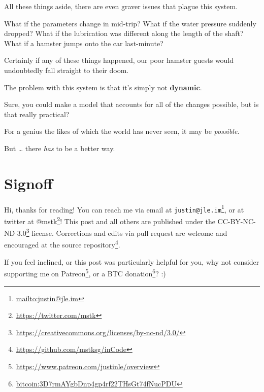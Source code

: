 \documentclass[]{article}
\renewcommand{\href}[2]{#2\footnote{\url{#1}}}
\begin{document}
All these things aside, there are even graver issues that plague this system.

What if the parameters change in mid-trip? What if the water pressure suddenly
dropped? What if the lubrication was different along the length of the shaft?
What if a hamster jumps onto the car last-minute?

Certainly if any of these things happened, our poor hamster guests would
undoubtedly fall straight to their doom.

The problem with this system is that it's simply not \textbf{dynamic}.

Sure, you could make a model that accounts for all of the changes possible, but
is that really practical?

For a genius the likes of which the world has never seen, it may be
\emph{possible}.

But \ldots{} there \emph{has} to be a better way.

\hypertarget{signoff}{%
\section{Signoff}\label{signoff}}

Hi, thanks for reading! You can reach me via email at
\href{mailto:justin@jle.im}{\nolinkurl{justin@jle.im}}, or at twitter at
\href{https://twitter.com/mstk}{@mstk}! This post and all others are published
under the \href{https://creativecommons.org/licenses/by-nc-nd/3.0/}{CC-BY-NC-ND
3.0} license. Corrections and edits via pull request are welcome and encouraged
at \href{https://github.com/mstksg/inCode}{the source repository}.

If you feel inclined, or this post was particularly helpful for you, why not
consider \href{https://www.patreon.com/justinle/overview}{supporting me on
Patreon}, or a \href{bitcoin:3D7rmAYgbDnp4gp4rf22THsGt74fNucPDU}{BTC donation}?
:)
\end{document}
